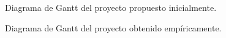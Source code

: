 \documentclass[a4paper, 12pt,twoside]{report}  %
\numberwithin{equation}{subsection} %
\begin{document}
\begin{figure}[H]
	\centering
	{%
		\setlength{\fboxsep}{0pt}%
		\setlength{\fboxrule}{0.5pt}%
	}%
	\caption{Diagrama de Gantt del proyecto propuesto inicialmente.}
	\label{diagrama de gantt 1}
\end{figure}

\begin{figure}[H]
	\centering
	{%
		\setlength{\fboxsep}{0pt}%
		\setlength{\fboxrule}{0.5pt}%
	}%
	\caption{Diagrama de Gantt del proyecto obtenido empíricamente.}
	\label{diagrama de gantt 2}
\end{figure}
\end{document}

